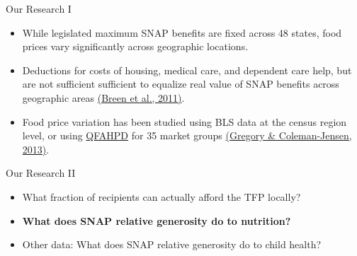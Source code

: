 \documentclass{beamer}
\begin{document}
\begin{frame}{Our Research I}
\begin{itemize}
\item
 While legislated maximum SNAP benefits are fixed across 48 states, food prices vary significantly across geographic locations.
\item Deductions for costs of housing, medical care, and dependent care help, but are not sufficient sufficient to equalize real value of SNAP benefits across geographic areas \href{http://www.childrenshealthwatch.org/publication/real-cost-of-a-healthy-diet-2011/}{(Breen et al., 2011)}.
\item Food price variation has been studied using BLS data at the census region level, or using \href{http://www.ers.usda.gov/data-products/quarterly-food-at-home-price-database.aspx}{QFAHPD} for 35 market groups \href{http://aepp.oxfordjournals.org/content/35/4/679}{(Gregory \& Coleman-Jensen, 2013)}.
\end{itemize}
\end{frame}

\begin{frame}{Our Research II}
\begin{itemize}
\item
 What fraction of recipients can actually afford the TFP locally?
\item 
\textbf{What does SNAP relative generosity do to nutrition?}
\item Other data: 
 What does SNAP relative generosity do to child health?
\end{itemize}
\end{frame}


{
    \begin{frame}[plain]
     \end{frame}
}
\end{document}
